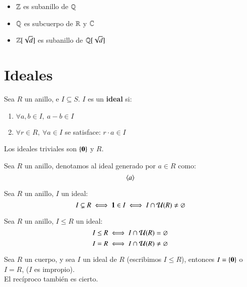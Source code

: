 \begin{eg}$ $
    \begin{itemize}
        \item $\mathbb{Z}$ es subanillo de $\mathbb{Q}$
        \item $\mathbb{Q}$ es subcuerpo de $\mathbb{R}$ y $\mathbb{C}$
        \item $\mathbb{Z}[\sqrt{d}]$ es subanillo de $\mathbb{Q}[\sqrt{d}]$
    \end{itemize}
\end{eg}

\section{Ideales}

\begin{dfn}[Ideal]
    Sea $R$ un anillo, e $I \subseteq S$. $I$ es un \textbf{ideal} si:
    \begin{enumerate}
        \item $\forall a, b \in I,\ a - b \in I$
        \item $\forall r \in R,\ \forall a \in I$ se satisface: $r\cdot a \in I$
    \end{enumerate}
    Los ideales triviales son $\{\mathbf{0}\}$ y $R$.
\end{dfn}

\begin{obs}
    Sea $R$ un anillo, denotamos al ideal generado por $a \in R$ como:
    $$
        \langle a\rangle
    $$
\end{obs}

\begin{pro}
    Sea $R$ un anillo, $I$ un ideal:
    $$
        I \subsetneq R \iff \mathbf{1} \in I \iff I \cap \mathcal{U}(R) \neq \varnothing
    $$
\end{pro}

\begin{obs}
    Sea $R$ un anillo, $I \leq R$ un ideal:
    $$
        I \leq R \iff I \cap \mathcal{U}(R) = \varnothing
    $$
    $$
        I = R \iff I \cap \mathcal{U}(R) \neq \varnothing
    $$
\end{obs}


\begin{pro}
    Sea $R$ un cuerpo, y sea $I$ un ideal de $R$ (escribimos $I \leq R$), entonces $I = \{\mathbf{0}\}$ o $I = R$, ($I$ es impropio).\\
    El recíproco también es cierto.
\end{pro}

